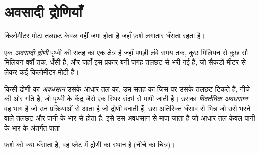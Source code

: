 \section{अवसादी द्रोणियाँ}\label{sec:b1:diagenesis-basins:basins}

किलोमीटर मोटा तलछट केवल वहीं जमा होता है जहाँ फ़र्श लगातार धँसता रहता है।

\begin{definition}[अवसादी द्रोणी]\label{def:b1:diagenesis-basins:basin}
एक \emph{अवसादी द्रोणी} पृथ्वी की सतह का एक क्षेत्र है जहाँ पपड़ी लंबे समय तक, कुछ मिलियन से कुछ सौ मिलियन वर्षों तक, धँसी है, और जहाँ इस प्रकार बनी जगह तलछट से भरी गई है, जो सैकड़ों मीटर से लेकर कई किलोमीटर मोटी है।
\end{definition}

\begin{definition}\label{def:b1:diagenesis-basins:subsidence}
किसी द्रोणी का \emph{अवधसान} उसके आधार-तल का, उस सतह का जिस पर उसके तलछट टिकते हैं, नीचे की ओर गति है, जो पृथ्वी के केंद्र जैसे एक स्थिर संदर्भ से मापी जाती है। उसका \emph{विवर्तनिक अवधसान} वह भाग है जो उन प्रक्रियाओं से आता है जो द्रोणी बनाती हैं, उस अतिरिक्त धँसाव से भिन्न जो उसे भरने वाले तलछट और पानी के भार से होता है; इसे उस अवधसान से मापा जाता है जो आधार-तल केवल पानी के भार के अंतर्गत पाता।
\end{definition}

फ़र्श को क्या धँसाता है, वह प्लेट में द्रोणी का स्थान है (नीचे का चित्र)।

